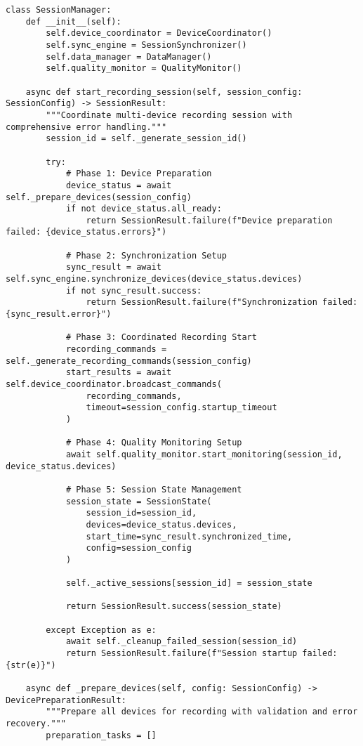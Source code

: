 \documentclass[12pt,a4paper]{report}
\begin{document}
\begin{verbatim}
class SessionManager:
    def __init__(self):
        self.device_coordinator = DeviceCoordinator()
        self.sync_engine = SessionSynchronizer()
        self.data_manager = DataManager()
        self.quality_monitor = QualityMonitor()

    async def start_recording_session(self, session_config: SessionConfig) -> SessionResult:
        """Coordinate multi-device recording session with comprehensive error handling."""
        session_id = self._generate_session_id()

        try:
            # Phase 1: Device Preparation
            device_status = await self._prepare_devices(session_config)
            if not device_status.all_ready:
                return SessionResult.failure(f"Device preparation failed: {device_status.errors}")

            # Phase 2: Synchronization Setup
            sync_result = await self.sync_engine.synchronize_devices(device_status.devices)
            if not sync_result.success:
                return SessionResult.failure(f"Synchronization failed: {sync_result.error}")

            # Phase 3: Coordinated Recording Start
            recording_commands = self._generate_recording_commands(session_config)
            start_results = await self.device_coordinator.broadcast_commands(
                recording_commands,
                timeout=session_config.startup_timeout
            )

            # Phase 4: Quality Monitoring Setup
            await self.quality_monitor.start_monitoring(session_id, device_status.devices)

            # Phase 5: Session State Management
            session_state = SessionState(
                session_id=session_id,
                devices=device_status.devices,
                start_time=sync_result.synchronized_time,
                config=session_config
            )

            self._active_sessions[session_id] = session_state

            return SessionResult.success(session_state)

        except Exception as e:
            await self._cleanup_failed_session(session_id)
            return SessionResult.failure(f"Session startup failed: {str(e)}")

    async def _prepare_devices(self, config: SessionConfig) -> DevicePreparationResult:
        """Prepare all devices for recording with validation and error recovery."""
        preparation_tasks = []


\end{verbatim}
\end{document}
